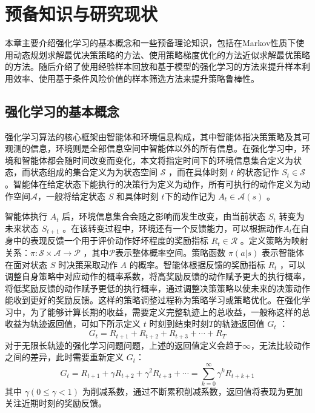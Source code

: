 
\chapter{预备知识与研究现状}\label{chap:background}

本章主要介绍强化学习的基本概念和一些预备理论知识，包括在Markov性质下使用动态规划求解最优决策策略的方法、使用策略梯度优化的方法近似求解最优策略的方法。随后介绍了使用经验样本回放和基于模型的强化学习的方法来提升样本利用效率、使用基于条件风险价值的样本筛选方法来提升策略鲁棒性。

\section{强化学习的基本概念}

强化学习算法的核心框架由智能体和环境信息构成，其中智能体指决策策略及其可观测的信息，环境则是全部信息空间中智能体以外的所有信息。在强化学习中，环境和智能体都会随时间改变而变化，本文将指定时间下的环境信息集合定义为状态，而状态组成的集合定义为为状态空间 $\mathcal S$ ，而在具体时刻 $t$ 的状态记作 $S_t\in \mathcal S$ 。智能体在给定状态下能执行的决策行为定义为动作，所有可执行的动作定义为动作空间$\mathcal{A}$，一般将给定状态 $S$ 和具体时刻 $t$下的动作记为 $A_t\in\mathcal{A}(s)$ 。

智能体执行 $A_t$ 后，环境信息集合会随之影响而发生改变，由当前状态 $S_t$ 转变为未来状态 $S_{t+1}$ 。在该转变过程中，环境还有一个反馈能力，可以根据动作$A_t$在自身中的表现反馈一个用于评价动作好坏程度的奖励指标 $R_{t}\in\mathcal{R}$ 。定义策略为映射关系：$\pi:\mathcal{S}\times\mathcal{A}\to \mathcal{P}$ ，其中$\mathcal P$表示整体概率空间。策略函数 $\pi(a|s)$ 表示智能体在面对状态 $S$ 时决策采取动作 $A$ 的概率。智能体根据反馈的奖励指标 $R_{t}$ ，可以调整自身策略中对应动作的概率系数，将高奖励反馈的动作赋予更大的执行概率，将低奖励反馈的动作赋予更低的执行概率，通过调整决策策略以使未来的决策动作能收到更好的奖励反馈。这样的策略调整过程称为策略学习或策略优化。在强化学习中，为了能够计算长期的收益，需要定义完整轨迹上的总收益，一般称这样的总收益为轨迹返回值，可如下所示定义 $t$ 时刻到结束时刻$T$的轨迹返回值 $G_t$ ：
\begin{equation}
G_t = R_{t+1}+R_{t+2}+R_{t+3}+\cdots+R_T
\end{equation}
对于无限长轨迹的强化学习问题问题，上述的返回值定义会趋于$\infty$，无法比较动作之间的差异，此时需要重新定义 $G_t$：
\begin{equation}
G_t = R_{t+1}+\gamma R_{t+2}+\gamma^2 R_{t+3}+\cdots = \sum_{k=0}^{\infty}\gamma^kR_{t+k+1}
\end{equation}
其中 $\gamma(0\leq \gamma < 1)$ 为削减系数，通过不断累积削减系数，返回值将表现为更加关注近期时刻的奖励反馈。

